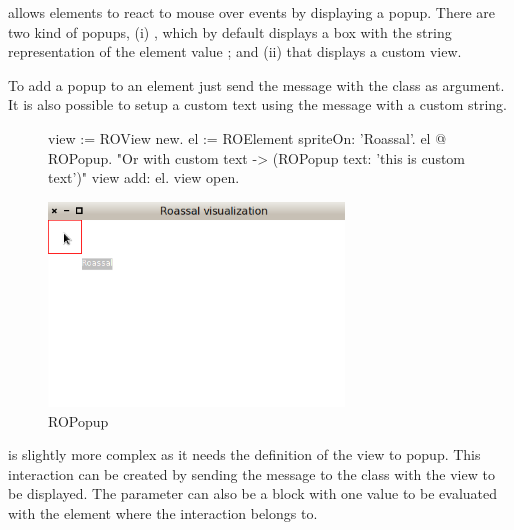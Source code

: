 \documentclass[a4paper,10pt,twoside]{book}
\begin{document}
 allows elements to react to mouse over events by displaying a popup. There are two kind of popups, (i) , which by default displays a box with the string representation of the element value ; and (ii)  that displays a custom view.

To add a popup to an element just send the  message with the  class as argument. It is also possible to setup a custom text using the  message with a custom string.

\begin{figure}[H]
      \begin{minipage}[t]{1\textwidth}
      \vspace{0pt}
     \begin{code}{}
view := ROView new.
el := ROElement spriteOn: 'Roassal'.
el @ ROPopup. "Or with custom text -> (ROPopup text: 'this is custom text')"
view add: el.
view open.
  \end{code}
   \end{minipage}
   \hfill
   \begin{minipage}[t]{1\textwidth}
	 \vspace{0pt} \raggedright
       \centering
		\includegraphics[width=0.7\textwidth]{popup}
   \end{minipage}
\label{fig:popup}
\caption{ROPopup}
\end{figure} 

 is slightly more complex as it needs the definition of the view to popup. This interaction can be created by sending the  message to the  class with the view to be displayed. The parameter can also be a block with one value to be evaluated with the element where the interaction belongs to. 
\end{document}
